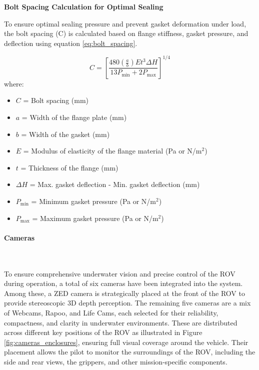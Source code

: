 \textbf{Bolt Spacing Calculation for Optimal Sealing}

To ensure optimal sealing pressure and prevent gasket deformation under load, the bolt spacing (C) is calculated based on flange stiffness, gasket pressure, and deflection using equation \ref{eq:bolt_spacing}.

\begin{equation} \label{eq:bolt_spacing}
    C = \left[ \frac{480 \left( \frac{a}{b} \right) E t^3 \Delta H}{13 P_{\text{min}} + 2 P_{\text{max}}} \right]^{1/4}
    \end{equation}
    where:
    \vspace{-0.5\baselineskip}
    \begin{itemize}
        \setlength{\itemsep}{0pt}
        \item \(C\) = Bolt spacing (mm)
        \item \(a\) = Width of the flange plate (mm)
        \item \(b\) = Width of the gasket (mm)
        \item \(E\) = Modulus of elasticity of the flange material (Pa or N/m\(^2\))
        \item \(t\) = Thickness of the flange (mm)
        \item \(\Delta H\) = Max. gasket deflection - Min. gasket deflection (mm)
        \item \(P_{\text{min}}\) = Minimum gasket pressure (Pa or N/m\(^2\))
        \item \(P_{\text{max}}\) = Maximum gasket pressure (Pa or N/m\(^2\))
    \end{itemize}
    

\vspace{-0.3cm}
\paragraph{Cameras} \ \\
\vspace{-0.5cm}

To ensure comprehensive underwater vision and precise control of the ROV during operation, a total of six cameras have been integrated into the system. Among these, a ZED camera is strategically placed at the front of the ROV to provide stereoscopic 3D depth perception. The remaining five cameras are a mix of Webcams, Rapoo, and Life Cams, each selected for their reliability, compactness, and clarity in underwater environments. These are distributed across different key positions of the ROV as illustrated in Figure \ref{fig:cameras_enclosures}, ensuring full visual coverage around the vehicle. Their placement allows the pilot to monitor the surroundings of the ROV, including the side and rear views, the grippers, and other mission-specific components.

